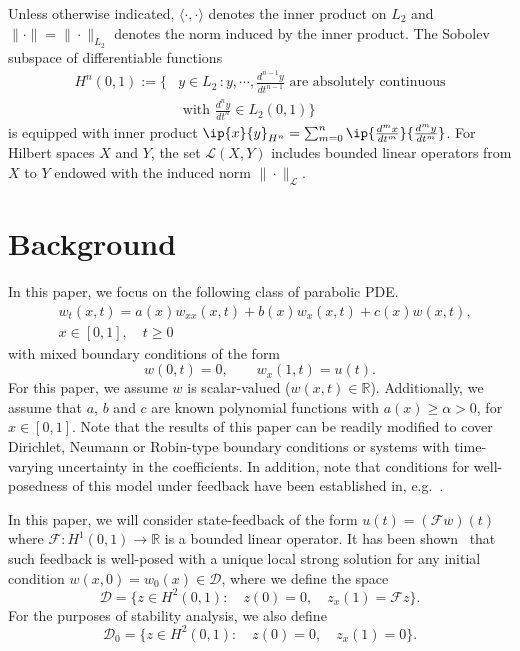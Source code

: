 \documentclass[9pt,journal,twocolumn]{IEEEtran}
\newcommand{\lt}{L_2(0,1)}
\newcommand{\mcl}[1]{\mathcal{#1}}
\begin{document}
Unless otherwise indicated, $\langle \cdot,\cdot \rangle$ denotes the inner product on $L_2$ and $\|\cdot\|=\|\cdot\|_{L_2}$ denotes the norm induced by the inner product.
The Sobolev subspace of differentiable functions 
\begin{align*}H^n(0,1):=\{& y \in L_2 \,:y,\cdots,\frac{d^{n-1}y}{dt^{n-1}} \text{ are absolutely continuous} \\
& \text{ with } \frac{d^{n}y}{dt^{n}} \in \lt \}
\end{align*} is equipped with inner product $\ip{x}{y}_{H^n} = \sum_{m=0}^n\ip{\frac{d^m x}{dt^m}}{\frac{d^m y}{dt^m}}$. For Hilbert spaces $X$ and $Y$, the set $\mcl{L}(X,Y)$ includes bounded linear operators from $X$ to $Y$ endowed with the induced norm $\|\cdot\|_\mathcal{L}$.

\section{Background}\label{proset}
In this paper, we focus on the following class of parabolic PDE.
\begin{align}
 &\label{eqn:PDE_form}w_t(x,t)=a(x)w_{xx}(x,t)+b(x)w_x(x,t)+c(x)w(x,t),\\
 & x \in [0,1], \quad t\ge 0 \nonumber
\end{align} with mixed boundary conditions of the form
\begin{equation}
\label{eqn:PDE_form_BC}
 w(0,t)=0, \qquad w_x(1,t)=u(t).
\end{equation}
 For this paper, we assume $w$ is scalar-valued ($w(x,t) \in \mathbb{R}$). Additionally, we assume that $a$, $b$ and $c$ are known polynomial functions with $a(x) \geq \alpha > 0$, for $x \in [0,1]$. Note that the results of this paper can be readily modified to cover Dirichlet, Neumann or Robin-type boundary conditions or systems with time-varying uncertainty in the coefficients.
In addition, note that conditions for well-posedness of this model under feedback have been established in, e.g.~\cite{triggiani1980well,lasiecka1983feedback,lasiecka1980unified,lions1972non}.


In this paper, we will consider state-feedback of the form $u(t)=(\mathcal{F}w)(t)$ where $\mathcal{F}: H^1(0,1) \rightarrow \mathbb{R}$ is a bounded linear operator. It has been shown~\cite{fridman2009lmi} that such feedback is well-posed with a unique local strong solution for any initial condition $w(x,0)=w_0(x) \in \mathcal{D}$, where we define the space
\begin{equation}
 \label{state_space}
 \mathcal{D}=\{z \in H^2(0,1): \quad z(0)=0, \quad z_x(1)=\mathcal{F}z\}.
\end{equation} For the purposes of stability analysis, we also define
\begin{equation}
 \label{state_space_stab}
 \mathcal{D}_0=\{z \in H^2(0,1): \quad z(0)=0, \quad z_x(1)=0\}.
\end{equation}
\end{document}
